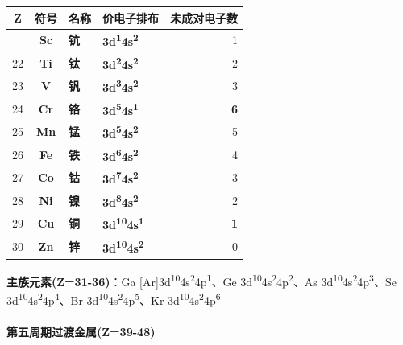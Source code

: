 {\def\LTcaptype{none} %
\begin{longtable}[]{@{}ccllr@{}}
\toprule\noalign{}
Z & 符号 & 名称 & 价电子排布 & 未成对电子数 \\
\midrule\noalign{}
\endhead
\bottomrule\noalign{}
\endlastfoot
21 & \textbf{Sc} & \textbf{钪} & \textbf{3d\textsuperscript{1}4s\textsuperscript{2}} & 1 \\
22 & \textbf{Ti} & \textbf{钛} & \textbf{3d\textsuperscript{2}4s\textsuperscript{2}} & 2 \\
23 & \textbf{V} & \textbf{钒} & \textbf{3d\textsuperscript{3}4s\textsuperscript{2}} & 3 \\
24 & \textbf{Cr} & \textbf{铬} & \textbf{3d\textsuperscript{5}4s\textsuperscript{1}} & \textbf{6} \\
25 & \textbf{Mn} & \textbf{锰} & \textbf{3d\textsuperscript{5}4s\textsuperscript{2}} & 5 \\
26 & \textbf{Fe} & \textbf{铁} & \textbf{3d\textsuperscript{6}4s\textsuperscript{2}} & 4 \\
27 & \textbf{Co} & \textbf{钴} & \textbf{3d\textsuperscript{7}4s\textsuperscript{2}} & 3 \\
28 & \textbf{Ni} & \textbf{镍} & \textbf{3d\textsuperscript{8}4s\textsuperscript{2}} & 2 \\
29 & \textbf{Cu} & \textbf{铜} & \textbf{3d\textsuperscript{10}4s\textsuperscript{1}} & \textbf{1} \\
30 & \textbf{Zn} & \textbf{锌} & \textbf{3d\textsuperscript{10}4s\textsuperscript{2}} & 0 \\
\end{longtable}
}

\textbf{主族元素(Z=31-36)}：Ga {[}Ar{]}3d\textsuperscript{10}4s\textsuperscript{2}4p\textsuperscript{1}、Ge 3d\textsuperscript{10}4s\textsuperscript{2}4p\textsuperscript{2}、As 3d\textsuperscript{10}4s\textsuperscript{2}4p\textsuperscript{3}、Se 3d\textsuperscript{10}4s\textsuperscript{2}4p\textsuperscript{4}、Br 3d\textsuperscript{10}4s\textsuperscript{2}4p\textsuperscript{5}、Kr 3d\textsuperscript{10}4s\textsuperscript{2}4p\textsuperscript{6}

\paragraph{第五周期过渡金属(Z=39-48)}\label{ux7b2cux4e94ux5468ux671fux8fc7ux6e21ux91d1ux5c5ez39-48}

